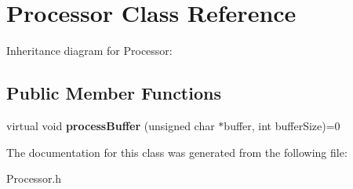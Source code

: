 \hypertarget{classProcessor}{}\section{Processor Class Reference}
\label{classProcessor}


Inheritance diagram for Processor\+:
\subsection*{Public Member Functions}
\begin{DoxyCompactItemize}
\item 
\mbox{\label{classProcessor_a401e57b59e43de9c4a51ca0f566d2948}} 
virtual void {\bfseries process\+Buffer} (unsigned char $\ast$buffer, int buffer\+Size)=0
\end{DoxyCompactItemize}


The documentation for this class was generated from the following file\+:\begin{DoxyCompactItemize}
\item 
Processor.\+h\end{DoxyCompactItemize}
